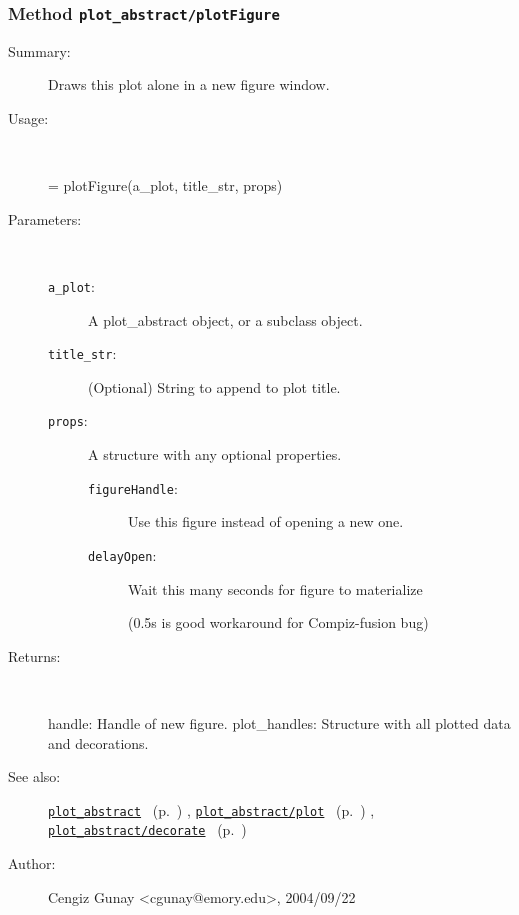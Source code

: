 \subsubsection[Method \texttt{plotFigure}]{Method \texttt{plot\_abstract/plotFigure}}%
%
\label{ref_plot_abstract__plotFigure}%
\hypertarget{ref_plot_abstract__plotFigure}{}%
\begin{description}
\item[Summary:]Draws this plot alone in a new figure window.
%
\item[Usage:]~%
\begin{lyxcode}%
[handle, plot\_handles] = plotFigure(a\_plot, title\_str, props)
%
\end{lyxcode}%
%
%
\item[Parameters:]~
\begin{description}%
\item[\texttt{a\_plot}:]
 A plot\_abstract object, or a subclass object.
\item[\texttt{title\_str}:]
 (Optional) String to append to plot title.
\item[\texttt{props}:]
 A structure with any optional properties.
\begin{description}%
\item[\texttt{figureHandle}:]
 Use this figure instead of opening a new one.
\item[\texttt{delayOpen}:]
 Wait this many seconds for figure to materialize 

(0.5s is good workaround for Compiz-fusion bug)
\end{description}%
\end{description}%
%
\item[Returns:
]~

   handle: Handle of new figure.
   plot\_handles: Structure with all plotted data and decorations.
%
%
\item[See also:]%
\hyperlink{ref_plot_abstract}{\texttt{plot\_abstract}}%
\ (p.~\pageref{ref_plot_abstract})%
%
, \hyperlink{ref_plot_abstract__plot}{\texttt{plot\_abstract/plot}}%
\ (p.~\pageref{ref_plot_abstract__plot})%
%
, \hyperlink{ref_plot_abstract__decorate}{\texttt{plot\_abstract/decorate}}%
\ (p.~\pageref{ref_plot_abstract__decorate})%
%
%
\item[Author:]%
Cengiz Gunay <cgunay@emory.edu>, 2004/09/22
%
\end{description}
\methodline%
